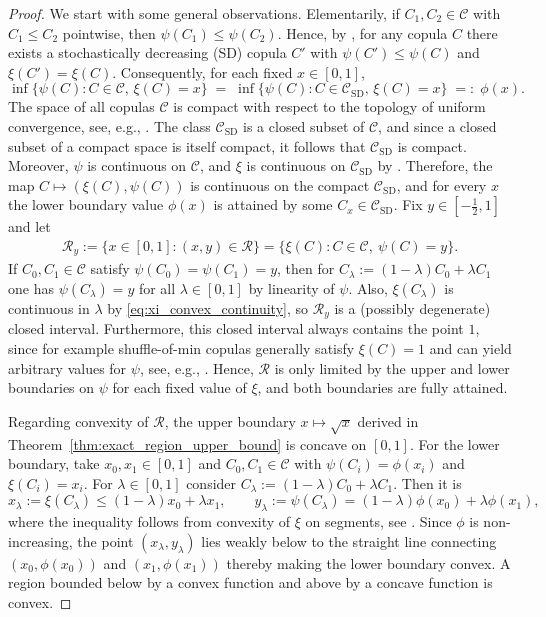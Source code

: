 \documentclass{article}
\newcommand{\1}{\mathds{1}}
\newcommand{\CC}{\mathcal{C}}  %
\begin{document}
\begin{proof}
We start with some general observations.
Elementarily, if $C_1,C_2\in\CC$ with $C_1\le C_2$ pointwise, then $\psi(C_1)\le\psi(C_2)$.
Hence, by \cite[Prop.~2.4 \& Cor.~2.5]{ansari2025exact}, for any copula $C$ there exists a stochastically decreasing (SD) copula $C'$ with
$\psi(C')\le \psi(C)$ and $\xi(C')=\xi(C)$.
Consequently, for each fixed $x\in[0,1]$,
\[
\inf\{\psi(C): C\in\CC,\,\xi(C)=x\}
\;=\;
\inf\{\psi(C): C\in\CC_{\mathrm{SD}},\,\xi(C)=x\}\;=:\;\phi(x).
\]
The space of all copulas $\CC$ is compact with respect to the topology of uniform convergence, see, e.g., \cite{trutschnig2017strong}.
The class $\CC_{\mathrm{SD}}$ is a closed subset of $\CC$, and since a closed subset of a compact space is itself compact, it follows that $\CC_{\mathrm{SD}}$ is compact.
Moreover, $\psi$ is continuous on $\CC$, and $\xi$ is continuous on $\CC_{\mathrm{SD}}$ by \cite[Cor.~3.6]{ansari2025continuity}.
Therefore, the map $C\mapsto(\xi(C),\psi(C))$ is continuous on the compact $\CC_{\mathrm{SD}}$, and for every $x$ the lower boundary value
\(
\phi(x)
\)
is attained by some $C_x\in\CC_{\mathrm{SD}}$.
Fix $y\in[-\tfrac12,1]$ and let
\begin{align}\label{eq:horizontal_slice}
\mathcal R_y:=\{x\in[0,1]: (x,y)\in\mathcal R\}=\{\xi(C): C\in\CC,\ \psi(C)=y\}.
\end{align}
If $C_0,C_1\in\CC$ satisfy $\psi(C_0)=\psi(C_1)=y$, then for $C_\lambda:=(1-\lambda)C_0+\lambda C_1$ one has $\psi(C_\lambda)=y$ for all $\lambda\in[0,1]$ by linearity of $\psi$.
Also, $\xi(C_\lambda)$ is continuous in $\lambda$ by \eqref{eq:xi_convex_continuity}, so $\mathcal R_y$ is a (possibly degenerate) closed interval.
Furthermore, this closed interval always contains the point $1$, since for example shuffle-of-min copulas generally satisfy $\xi(C)=1$ and can yield arbitrary values for $\psi$, see, e.g., \cite{durante2012approximation,rockel2025measures}.
Hence, $\mathcal R$ is only limited by the upper and lower boundaries on $\psi$ for each fixed value of $\xi$, and both boundaries are fully attained.

Regarding convexity of $\mathcal R$, the upper boundary $x\mapsto \sqrt{x}$ derived in Theorem~\ref{thm:exact_region_upper_bound} is concave on $[0,1]$.
For the lower boundary, take $x_0,x_1\in[0,1]$ and $C_0,C_1\in\CC$ with $\psi(C_i)=\phi(x_i)$ and $\xi(C_i)=x_i$.
For $\lambda\in[0,1]$ consider $C_\lambda:=(1-\lambda)C_0+\lambda C_1$.
Then it is
\[
    x_\lambda:=\xi(C_\lambda)\le (1-\lambda)x_0+\lambda x_1,
    \qquad
    y_\lambda:=\psi(C_\lambda)=(1-\lambda)\phi(x_0)+\lambda \phi(x_1),
\]
where the inequality follows from convexity of $\xi$ on segments, see \cite[Lem.~2.6]{ansari2025exact}.
Since $\phi$ is non-increasing, the point $(x_\lambda,y_\lambda)$ lies weakly below to the straight line connecting $(x_0,\phi(x_0))$ and $(x_1,\phi(x_1))$ thereby making the lower boundary convex.
A region bounded below by a convex function and above by a concave function is convex.


\end{proof}
\end{document}
